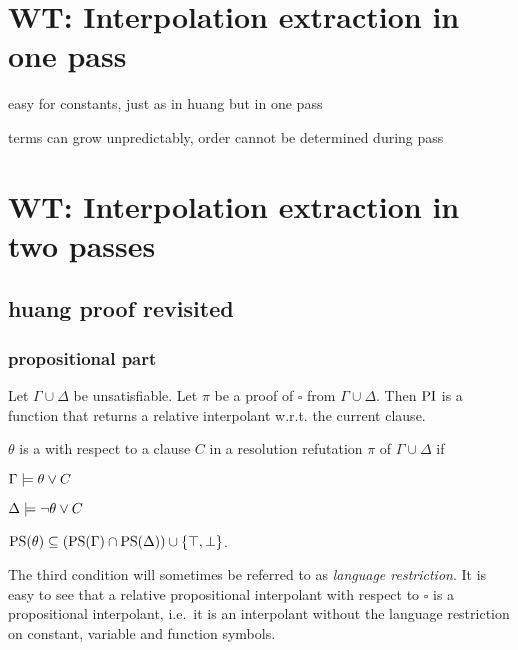 \section{WT: Interpolation extraction in one pass}

easy for constants, just as in huang but in one pass

terms can grow unpredictably, order cannot be determined during pass

\section{WT: Interpolation extraction in two passes}

\subsection{huang proof revisited}

\subsubsection{propositional part}

Let $\Gamma \cup \Delta$ be unsatisfiable. Let $\pi$ be a proof of $\square$ from $\Gamma \cup \Delta$. Then $\mathrm{PI}$ is a function that returns a relative interpolant w.r.t. the current clause. 

\begin{defi}
	$\theta$ is a  with respect to a clause $C$ in a resolution refutation $\pi$ of $\Gamma \cup \Delta$ if 
	\label{def:rel_prop_interpol}
	\begin{compactenum}
		\item $\Gamma \models \theta \lor C$
			\label{rel_prop_interpol_cond1}
		\item $\Delta \models \lnot \theta \lor C$
			\label{rel_prop_interpol_cond2}
		\item $\mathrm{PS}(\theta) \subseteq (\mathrm{PS}(\Gamma) \cap \mathrm{PS}(\Delta)) \cup \{\top, \bot\} $.
			\label{rel_prop_interpol_cond_lang}
			\qedhere
	\end{compactenum}
\end{defi}

The third condition will sometimes be referred to as \emph{language restriction}.
It is easy to see that a relative propositional interpolant with respect to $\square$ is a propositional interpolant, i.e.~it is an interpolant without the language restriction on constant, variable and function symbols.

